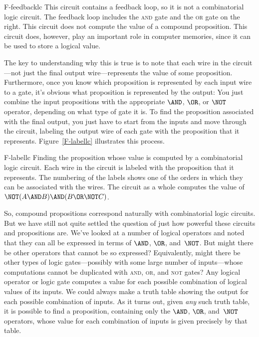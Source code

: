 \fig
   {F-feedbacklc}
   {This circuit contains a feedback loop, so it is not a
    combinatorial logic circuit.  The feedback loop includes
    the \textsc{and} gate and the \textsc{or} gate on the right.
    This circuit does not compute the value of a compound proposition.
    This circuit does, however, play an important role in computer
    memories, since it can be used to store a logical value.}
   {}

The key to understanding why this is true
is to note that each wire in the circuit---not just the final
output wire---represents the value of some proposition.  
Furthermore, once you know which proposition is represented by
each input wire to a gate, it's obvious what proposition is
represented by the output: You just combine the input propositions
with the appropriate $\AND$, $\OR$, or $\NOT$ operator, depending
on what type of gate it is.   To find
the proposition associated with the final output, you just have to
start from the inputs and move through the circuit, labeling the
output wire of each gate with the proposition that it represents.
Figure~\ref{F-labellc} illustrates this process.

\fig
    {F-labellc}
    {Finding the proposition whose value is computed by a
     combinatorial logic circuit.  Each wire in the circuit is
     labeled with the proposition that it represents.  The
     numbering of the labels shows one of the orders in which they 
     can be associated with the wires.  The circuit as a whole
     computes the value of $\NOT(A\AND B)\AND(B\OR\NOT C)$.}
    {}

\medbreak
   
So, compound propositions correspond naturally with combinatorial
logic circuits.  But we have still not quite settled the question
of just how powerful these circuits and propositions are.
We've looked at a number of logical operators and noted that they
can all be expressed in terms of $\AND$, $\OR$, and~$\NOT$.
But might there be other operators that cannot be so expressed?
Equivalently, might there be other types of logic gates---possibly
with some large number of inputs---whose
computations cannot be duplicated with \textsc{and}, \textsc{or}, and
\textsc{not} gates?   Any logical operator or logic gate computes
a value for each possible combination of logical values of its inputs.
We could always make a truth table showing the output for each 
possible combination of inputs.  As it turns out, given \emph{any} such
truth table, it is possible to find a proposition, containing only
the $\AND$, $\OR$, and~$\NOT$ operators, whose value for each combination
of inputs is given precisely by that table.    

